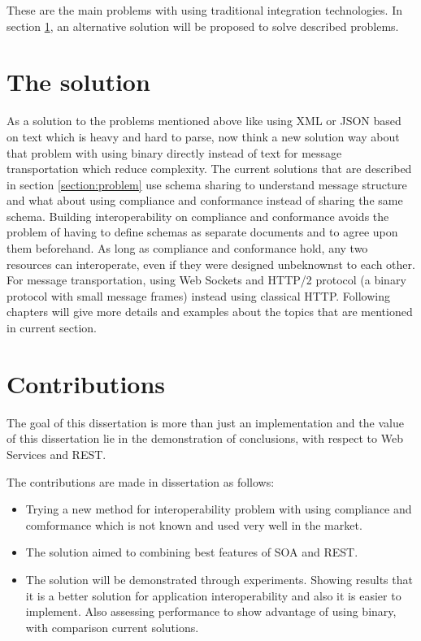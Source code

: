 These are the main problems with using traditional integration technologies. In section \ref{section:solution}, an alternative solution will be proposed to solve described problems.

\section{The solution}
\label{section:solution}

As a solution to the problems mentioned above like using XML or JSON based on text which is heavy and hard to parse, now think a new solution way about that problem with using binary directly instead of text for message transportation which reduce complexity. The current solutions that are described in section \ref{section:problem} use schema sharing to understand message structure and what about using compliance and conformance instead of sharing the same schema. Building interoperability on compliance and conformance avoids the problem of having to define schemas as separate documents and to agree upon them beforehand. As long as compliance and conformance hold, any two resources can interoperate, even if they were designed unbeknownst to each other. For message transportation, using Web Sockets and HTTP/2 protocol (a binary protocol with small message frames) instead using classical HTTP. Following chapters will give more details and examples about the topics that are mentioned in current section.

\section{Contributions}
\label{section:contributions}
The goal of this dissertation is more than just an implementation and the value of this dissertation lie in the demonstration of conclusions, with respect to Web Services and REST.

The contributions are  made in dissertation as follows:

\begin{itemize}
  \item Trying a new method for interoperability problem with using compliance and comformance which is not known and used very well in the market.
  \item The solution aimed to combining best features of SOA and REST.
  \item The solution will be demonstrated through experiments. Showing results that it is a better solution for application interoperability and also it is easier to implement. Also assessing performance to show advantage of using binary, with comparison current solutions.
\end{itemize}

